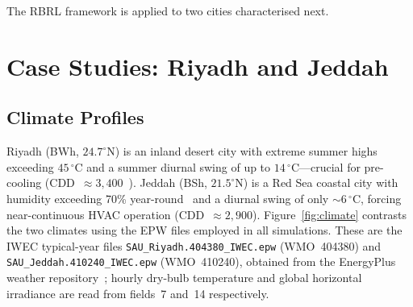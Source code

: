 \documentclass[3p,number]{elsarticle}
\let\oldsection\section
\renewcommand{\section}{\FloatBarrier\oldsection}
\let\oldsubsection\subsection
\renewcommand{\subsection}{\FloatBarrier\oldsubsection}
\begin{document}
The RBRL framework is applied to two cities characterised next.
 
\section{Case Studies: Riyadh and Jeddah}
\label{sec:casestudy}
 
\subsection{Climate Profiles}
\label{subsec:climate}
 
Riyadh (BWh, $24.7^\circ$N) is an inland desert city with extreme summer highs exceeding $45\,^\circ$C and a summer diurnal swing of up to $14\,^\circ$C---crucial for pre-cooling (CDD~$\approx3{,}400$~\cite{Haddad2024}).
Jeddah (BSh, $21.5^\circ$N) is a Red Sea coastal city with humidity exceeding 70\% year-round~\cite{Rodrigues2025} and a diurnal swing of only ${\sim}6\,^\circ$C, forcing near-continuous HVAC operation (CDD~$\approx2{,}900$).
Figure~\ref{fig:climate} contrasts the two climates using the EPW files employed in all simulations. These are the IWEC typical-year files \texttt{SAU\_Riyadh.404380\_IWEC.epw} (WMO~404380) and \texttt{SAU\_Jeddah.410240\_IWEC.epw} (WMO~410240), obtained from the EnergyPlus weather repository~\cite{EPW2023}; hourly dry-bulb temperature and global horizontal irradiance are read from fields~7 and~14 respectively.
 
\end{document}

